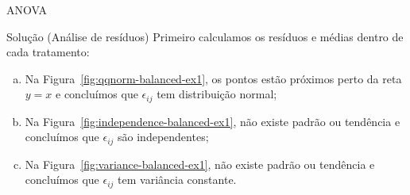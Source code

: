 \documentclass[8pt]{beamer}
\begin{document}
\begin{frame}{ANOVA}

\begin{block}{Solução (Análise de resíduos)}
	Primeiro calculamos os resíduos e médias dentro de cada tratamento:
		\begin{table}[ht]
		\centering
		\caption{Resistência à tração} 
		\label{tab:resistencia-residuos}
	\end{table}

	\begin{enumerate}[(a)]
		\item Na Figura~\ref{fig:qqnorm-balanced-ex1}, os pontos estão próximos perto da reta $y = x$ e concluímos que $\epsilon_{ij}$ tem distribuição normal;
		\item Na Figura~\ref{fig:independence-balanced-ex1}, não existe padrão ou tendência e concluímos que $\epsilon_{ij}$ são independentes;
		\item Na Figura~\ref{fig:variance-balanced-ex1}, não existe padrão ou tendência e concluímos que  $\epsilon_{ij}$ tem variância constante.
	\end{enumerate}
\end{block}
\end{frame}
\end{document}
